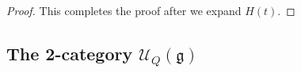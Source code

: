 \documentclass{amsart}
\numberwithin{equation}{section}
\theoremstyle{definition}
\newcommand{\Ucat}{\mathcal{U}_Q}
\newcommand{\LLn}[1][n]{{\mathsf{L}_{#1}}}
\begin{document}
\begin{proof}
This completes the proof after we expand $H(t)$.
\end{proof}



%
\subsection{The 2-category $\Ucat(\mathfrak{g})$}  
%
\end{document}
